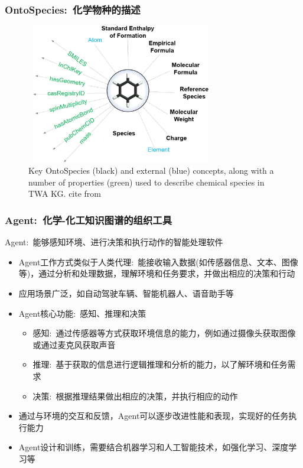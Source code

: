 \frame
{
	\frametitle{\textrm{OntoSpecies}:~化学物种的描述}
\begin{figure}[h!]
\centering
\vskip -8pt
\includegraphics[height=2.40in,width=3.25in,viewport=0 0 990 750,clip]{Figures/Key_OntoSpecies-and-external_concepts.png}
\caption{\tiny\textrm{Key OntoSpecies (black) and external (blue) concepts, along with a number of properties (green) used to describe chemical species in TWA KG. cite from\cite{ACR56-128_2023}}}%
\label{Fig:Key-OntoSpecies-and-external-concepts}
\end{figure}
}

\frame
{
	\frametitle{\textrm{Agent}:~化学-化工知识图谱的组织工具}
	\textrm{Agent}:~能够感知环境、进行决策和执行动作的智能处理软件
	\begin{itemize}
		\item \textrm{Agent}工作方式类似于人类代理:~能接收输入数据(如传感器信息、文本、图像等)，通过分析和处理数据，理解环境和任务要求，并做出相应的决策和行动
		\item 应用场景广泛，如自动驾驶车辆、智能机器人、语音助手等
		\item \textrm{Agent}核心功能:~感知、推理和决策
			\begin{itemize}
				\item 感知:~通过传感器等方式获取环境信息的能力，例如通过摄像头获取图像或通过麦克风获取声音
				\item 推理:~基于获取的信息进行逻辑推理和分析的能力，以了解环境和任务需求
				\item 决策:~根据推理结果做出相应的决策，并执行相应的动作
			\end{itemize}
		\item 通过与环境的交互和反馈，\textrm{Agent}可以逐步改进性能和表现，实现好的任务执行能力\\
		\item \textrm{Agent}设计和训练，需要结合机器学习和人工智能技术，如强化学习、深度学习等
	\end{itemize}
}

